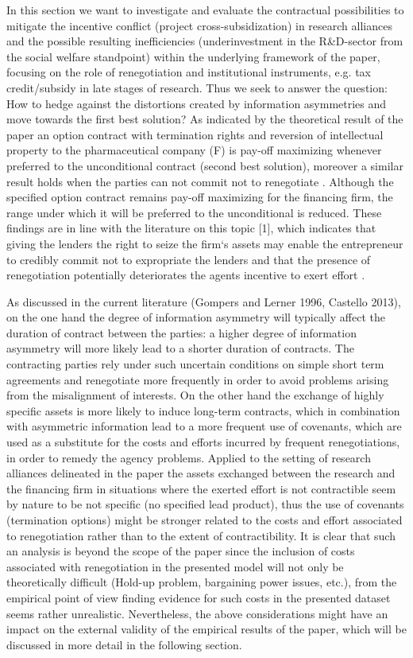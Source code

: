 In this section we want to investigate and evaluate the contractual possibilities to mitigate the incentive conflict (\grqq project cross-subsidization\grqq) in research alliances and the possible resulting inefficiencies (underinvestment in the R\&D-sector from the social welfare standpoint) within the underlying framework of the paper, focusing on the role of renegotiation and institutional instruments, e.g. tax credit/subsidy in late stages of research. Thus we seek to answer the question: How to hedge against the distortions created by information asymmetries and move towards the first best solution?
As indicated by the theoretical result of the paper an option contract with termination rights and reversion of intellectual property to the pharmaceutical company (F) is pay-off maximizing whenever preferred to the unconditional contract (second best solution), moreover a similar result holds when the parties can not commit not to renegotiate . Although the specified option contract remains pay-off maximizing for the financing firm, the range under which it will be preferred to the unconditional is reduced. These findings are in line with the literature on this topic [1], which indicates that giving the lenders the right to seize the firm`s assets may enable the entrepreneur to credibly commit not to expropriate the lenders  and that the presence of renegotiation potentially deteriorates the agents incentive to exert effort .

As discussed in the current literature (Gompers and Lerner 1996, Castello 2013), on the one hand the degree of information asymmetry will typically affect the duration of contract between the parties: a higher degree of information asymmetry will more likely lead to a shorter duration of contracts. The contracting parties rely under such uncertain conditions on simple short term agreements and renegotiate more frequently in order to avoid problems arising from the misalignment of interests. On the other hand the exchange of highly specific assets is more likely to induce long-term contracts, which in combination with asymmetric information lead to a more frequent use of covenants, which are used as a substitute for the costs and efforts incurred by frequent renegotiations, in order to remedy the agency problems. Applied to the setting of research alliances delineated in the paper the assets exchanged between the research and the financing firm in situations where the exerted effort is not contractible seem by nature to be not specific (no specified lead product), thus the use of covenants (termination options) might be stronger related to the costs and effort associated to renegotiation rather than to the extent of contractibility. It is clear that such an analysis is beyond the scope of the paper since the inclusion of costs associated with renegotiation in the presented model will not only be theoretically difficult (\grqq Hold-up problem\grqq, bargaining power issues, etc.), from the empirical point of view finding evidence for such costs in the presented dataset seems rather unrealistic. Nevertheless, the above considerations might have an impact on the external validity of the empirical results of the paper, which will be discussed in more detail in the following section.

